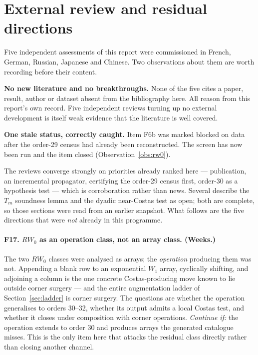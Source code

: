 \documentclass[11pt,a4paper]{article}
\theoremstyle{definition}
\begin{document}
\section{External review and residual directions}
\label{sec:review}

Five independent assessments of this report were commissioned in French, German,
Russian, Japanese and Chinese. Two observations about them are worth recording
before their content.

\textbf{No new literature and no breakthroughs.} None of the five cites a paper,
result, author or dataset absent from the bibliography here. All reason from this
report's own record. Five independent reviews turning up no external development
is itself weak evidence that the literature is well covered.

\textbf{One stale status, correctly caught.} Item F6b was marked blocked on data
after the order-29 census had already been reconstructed. The screen has now been
run and the item closed (Observation~\ref{obs:rw0}).

The reviews converge strongly on priorities already ranked here --- publication,
an incremental propagator, certifying the order-29 census first, order-30 as a
hypothesis test --- which is corroboration rather than news. Several describe the
$T_m$ soundness lemma and the dyadic near-Costas test as open; both are complete,
so those sections were read from an earlier snapshot. What follows are the five
directions that were \emph{not} already in this programme.

\paragraph{F17. $RW_0$ as an operation class, not an array class. (Weeks.)}
The two $RW_0$ classes were analysed as arrays; the \emph{operation} producing
them was not. Appending a blank row to an exponential $W_1$ array, cyclically
shifting, and adjoining a column is the one concrete Costas-producing move known
to lie outside corner surgery --- and the entire augmentation ladder of
Section~\ref{sec:ladder} is corner surgery. The questions are whether the
operation generalises to orders 30--32, whether its output admits a local Costas
test, and whether it closes under composition with corner operations.
\emph{Continue if:} the operation extends to order 30 and produces arrays the
generated catalogue misses. This is the only item here that attacks the residual
class directly rather than closing another channel.
\end{document}
